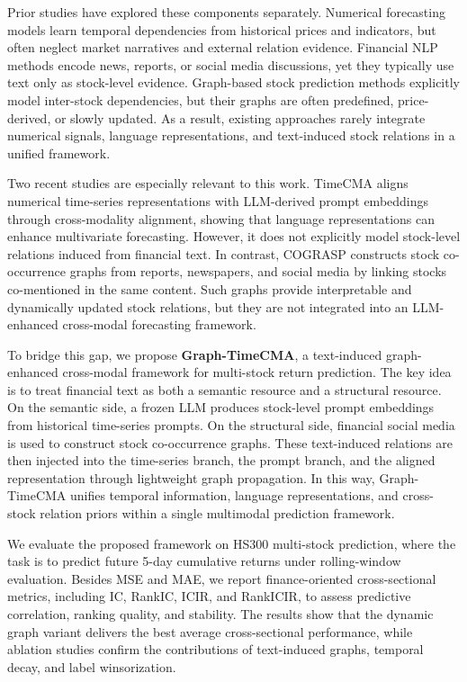 Prior studies have explored these components separately. Numerical forecasting models learn temporal dependencies from historical prices and indicators, but often neglect market narratives and external relation evidence. Financial NLP methods encode news, reports, or social media discussions, yet they typically use text only as stock-level evidence. Graph-based stock prediction methods explicitly model inter-stock dependencies, but their graphs are often predefined, price-derived, or slowly updated. As a result, existing approaches rarely integrate numerical signals, language representations, and text-induced stock relations in a unified framework.

Two recent studies are especially relevant to this work. TimeCMA aligns numerical time-series representations with LLM-derived prompt embeddings through cross-modality alignment, showing that language representations can enhance multivariate forecasting. However, it does not explicitly model stock-level relations induced from financial text. In contrast, COGRASP constructs stock co-occurrence graphs from reports, newspapers, and social media by linking stocks co-mentioned in the same content. Such graphs provide interpretable and dynamically updated stock relations, but they are not integrated into an LLM-enhanced cross-modal forecasting framework.

To bridge this gap, we propose \textbf{Graph-TimeCMA}, a text-induced graph-enhanced cross-modal framework for multi-stock return prediction. The key idea is to treat financial text as both a semantic resource and a structural resource. On the semantic side, a frozen LLM produces stock-level prompt embeddings from historical time-series prompts. On the structural side, financial social media is used to construct stock co-occurrence graphs. These text-induced relations are then injected into the time-series branch, the prompt branch, and the aligned representation through lightweight graph propagation. In this way, Graph-TimeCMA unifies temporal information, language representations, and cross-stock relation priors within a single multimodal prediction framework.

We evaluate the proposed framework on HS300 multi-stock prediction, where the task is to predict future 5-day cumulative returns under rolling-window evaluation. Besides MSE and MAE, we report finance-oriented cross-sectional metrics, including IC, RankIC, ICIR, and RankICIR, to assess predictive correlation, ranking quality, and stability. The results show that the dynamic graph variant delivers the best average cross-sectional performance, while ablation studies confirm the contributions of text-induced graphs, temporal decay, and label winsorization.

